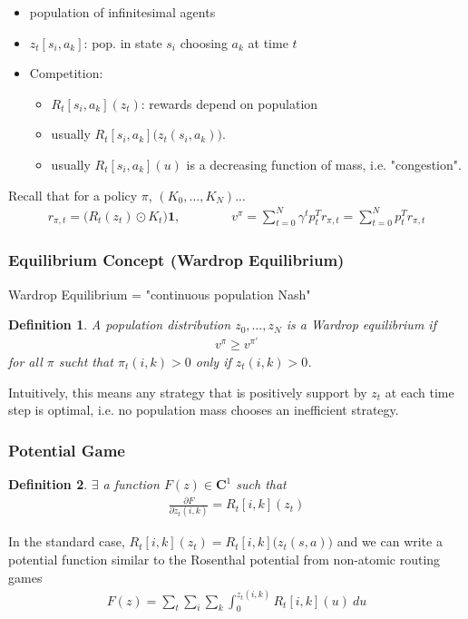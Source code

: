 \documentclass[]{article}
\newtheorem{definition}{Definition}
\newcommand{\mbf}{\mathbf}
\begin{document}
\begin{itemize}
\item population of infinitesimal agents
\item $z_t[s_i,a_k]$:  pop. in state $s_i$ choosing $a_k$ at time $t$
\item Competition: 
\begin{itemize}
\item $R_t[s_i,a_k](z_t)$:  rewards depend on population
\item usually $R_t[s_i,a_k]\Big(z_t(s_i,a_k)\Big)$. 
\item usually $R_t[s_i,a_k](u)$ is a decreasing function of mass, i.e. "congestion".
\end{itemize}
\end{itemize}
Recall that for a policy $\pi$, $(K_0,\dots,K_N)$...
\begin{align}
r_{\pi,t} = \Big(R_t(z_t) \odot K_t \Big) \mbf{1}, \qquad \qquad
v^\pi  = \sum_{t=0}^N \gamma^t p_t^T r_{\pi,t} = 
\sum_{t=0}^N p_t^T r_{\pi,t}
\end{align}

\subsubsection*{Equilibrium Concept (Wardrop Equilibrium)}
Wardrop Equilibrium = "continuous population Nash"

\begin{definition}
A population distribution $z_0,\dots,z_N$ is a \emph{Wardrop equilibrium} if
\begin{align}
v^\pi \geq v^{\pi'}
\end{align}
for all $\pi$ sucht that $\pi_t(i,k) > 0$ only if $z_t(i,k) >0$.  
\end{definition}
Intuitively, this means any strategy that is positively support by $z_t$ at each time step is optimal, i.e. no population mass chooses an inefficient strategy.  

\subsubsection*{Potential Game}
\begin{definition}
$\exists$ a function $F(z) \in \mbf{C}^1$ such that
\begin{align}
\frac{\partial F}{\partial z_t(i,k)} = R_t[i,k](z_t)
\end{align}
\end{definition}
In the standard case, $R_t[i,k] (z_t) = R_t[i,k]\Big(z_t(s,a)\Big)$ and we can write a potential function similar to the Rosenthal potential from non-atomic routing games
\begin{align}
F(z) = \sum_t \sum_i \sum_k \int_0^{z_t(i,k)} R_t[i,k](u) \ du
\end{align}
\end{document}
